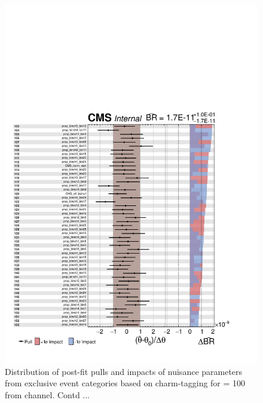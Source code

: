 \begin{figure}
\begin{center}
\includegraphics[width=1.0\textwidth]{Image/MLFit/ImpactNuis/nuisImpact3.pdf}
 \caption{Distribution of post-fit pulls and impacts of nuisance 
     parameters from exclusive event categories based on charm-tagging 
     for \mHp = 100 \GeV from \ljets channel. Contd ...}
\label{fig:nuisImpact3}
\end{center}
\end{figure}


